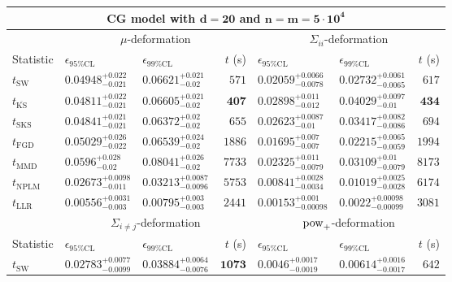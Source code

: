 \begin{tabular}{l|llr|llr}
	\toprule
	\multicolumn{7}{c}{{\bf CG model with $\mathbf{d=20}$ and $\mathbf{n=m=5\cdot 10^{4}}$}} \\
	\toprule
	\multicolumn{1}{c}{} & \multicolumn{3}{c}{$\mu$-deformation} & \multicolumn{3}{c}{$\Sigma_{ii}$-deformation} \\
	Statistic & $\epsilon_{95\%\mathrm{CL}}$ & $\epsilon_{99\%\mathrm{CL}}$ & $t$ (s) & $\epsilon_{95\%\mathrm{CL}}$ & $\epsilon_{99\%\mathrm{CL}}$ & $t$ (s) \\
	\midrule
	$t_{\mathrm{SW}}$ & $0.04948_{-0.021}^{+0.022}$ & $0.06621_{-0.02}^{+0.021}$ & $571$ & $0.02059_{-0.0078}^{+0.0066}$ & $0.02732_{-0.0065}^{+0.0061}$ & $617$ \\
	$t_{\overline{\mathrm{KS}}}$ & ${\mathbf{0.04811_{-0.021}^{+0.022}}}$ & $0.06605_{-0.02}^{+0.021}$ & ${\mathbf{407}}$ & $0.02898_{-0.012}^{+0.011}$ & $0.04029_{-0.01}^{+0.0097}$ & ${\mathbf{434}}$ \\
	$t_{\mathrm{SKS}}$ & $0.04841_{-0.021}^{+0.021}$ & ${\mathbf{0.06372_{-0.02}^{+0.02}}}$ & $655$ & $0.02623_{-0.01}^{+0.0087}$ & $0.03417_{-0.0086}^{+0.0082}$ & $694$ \\
	$t_{\mathrm{FGD}}$ & $0.05029_{-0.022}^{+0.026}$ & $0.06539_{-0.02}^{+0.024}$ & $1886$ & ${\mathbf{0.01695_{-0.007}^{+0.007}}}$ & ${\mathbf{0.02215_{-0.0059}^{+0.0065}}}$ & $1994$ \\
	$t_{\mathrm{MMD}}$ & $0.0596_{-0.02}^{+0.028}$ & $0.08041_{-0.02}^{+0.026}$ & $7733$ & $0.02325_{-0.0079}^{+0.011}$ & $0.03109_{-0.0079}^{+0.01}$ & $8173$ \\
\rowcolor{red!35}	$t_{\mathrm{NPLM}}$ & $0.02673_{-0.011}^{+0.0098}$ & $0.03213_{-0.0096}^{+0.0087}$ & $5753$ & $0.00841_{-0.0034}^{+0.0028}$ & $0.01019_{-0.0028}^{+0.0025}$ & $6174$ \\
	$t_{\mathrm{LLR}}$ & $0.00556_{-0.003}^{+0.0031}$ & $0.00795_{-0.003}^{+0.003}$ & $2441$ & $0.00153_{-0.00098}^{+0.001}$ & $0.0022_{-0.00099}^{+0.00098}$ & $3081$ \\
	\toprule
	\multicolumn{1}{c}{} & \multicolumn{3}{c}{$\Sigma_{i\neq j}$-deformation} & \multicolumn{3}{c}{$\rm{pow}_{+}$-deformation} \\
	Statistic & $\epsilon_{95\%\mathrm{CL}}$ & $\epsilon_{99\%\mathrm{CL}}$ & $t$ (s) & $\epsilon_{95\%\mathrm{CL}}$ & $\epsilon_{99\%\mathrm{CL}}$ & $t$ (s) \\
	\midrule
	$t_{\mathrm{SW}}$ & $0.02783_{-0.0099}^{+0.0077}$ & $0.03884_{-0.0076}^{+0.0064}$ & ${\mathbf{1073}}$ & $0.0046_{-0.0019}^{+0.0017}$ & $0.00614_{-0.0017}^{+0.0016}$ & $642$ \\

\end{tabular}
